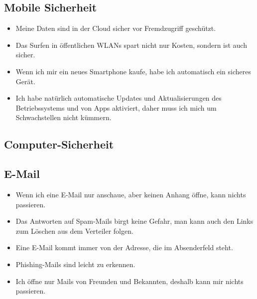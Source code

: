 \subsection{Mobile Sicherheit}

\begin{frame}
\begin{itemize}
	\item Meine Daten sind in der Cloud sicher vor Fremdzugriff geschützt.
	\item Das Surfen in öffentlichen WLANs spart nicht nur Kosten, sondern ist auch sicher.
	\item Wenn ich mir ein neues Smartphone kaufe, habe ich automatisch ein sicheres Gerät.
	\item Ich habe natürlich automatische Updates und Aktualisierungen des Betriebssystems und von Apps aktiviert, daher muss ich mich um Schwachstellen nicht kümmern.
\end{itemize}
\end{frame}

\subsection{Computer-Sicherheit}


\subsection{E-Mail}

\begin{frame}
\begin{itemize}
	\item Wenn ich eine E-Mail nur anschaue, aber keinen Anhang öffne, kann nichts passieren.
	\item Das Antworten auf Spam-Mails birgt keine Gefahr, man kann auch den Links zum Löschen aus dem Verteiler folgen.
	\item Eine E-Mail kommt immer von der Adresse, die im Absenderfeld steht.
	\item Phishing-Mails sind leicht zu erkennen.
	\item Ich öffne nur Mails von Freunden und Bekannten, deshalb kann mir nichts passieren.
\end{itemize}
\end{frame}

